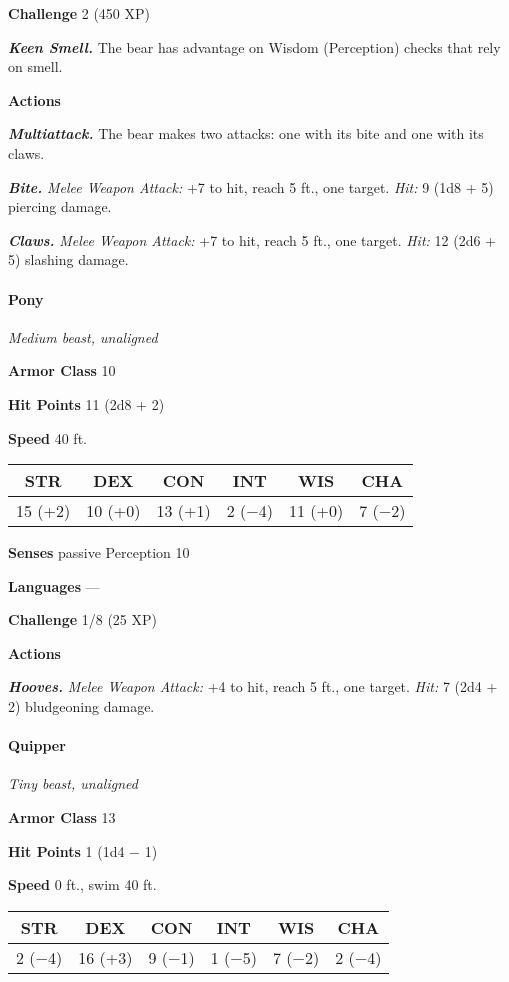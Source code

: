 \documentclass[
]{article}
\begin{document}
\textbf{Challenge} 2 (450 XP)

\emph{\textbf{Keen Smell.}} The bear has advantage on Wisdom
(Perception) checks that rely on smell.

\textbf{Actions}

\emph{\textbf{Multiattack.}} The bear makes two attacks: one with its
bite and one with its claws.

\emph{\textbf{Bite.}} \emph{Melee Weapon Attack:} +7 to hit, reach 5
ft., one target. \emph{Hit:} 9 (1d8 + 5) piercing damage.

\emph{\textbf{Claws.}} \emph{Melee Weapon Attack:} +7 to hit, reach 5
ft., one target. \emph{Hit:} 12 (2d6 + 5) slashing damage.

\hypertarget{pony}{%
\paragraph{Pony}\label{pony}}

\emph{Medium beast, unaligned}

\textbf{Armor Class} 10

\textbf{Hit Points} 11 (2d8 + 2)

\textbf{Speed} 40 ft.

\begin{longtable}[]{@{}cccccc@{}}
\toprule
STR & DEX & CON & INT & WIS & CHA\tabularnewline
\midrule
\endhead
15 (+2) & 10 (+0) & 13 (+1) & 2 (−4) & 11 (+0) & 7 (−2)\tabularnewline
\bottomrule
\end{longtable}

\textbf{Senses} passive Perception 10

\textbf{Languages} ---

\textbf{Challenge} 1/8 (25 XP)

\textbf{Actions}

\emph{\textbf{Hooves.}} \emph{Melee Weapon Attack:} +4 to hit, reach 5
ft., one target. \emph{Hit:} 7 (2d4 + 2) bludgeoning damage.

\hypertarget{quipper}{%
\paragraph{Quipper}\label{quipper}}

\emph{Tiny beast, unaligned}

\textbf{Armor Class} 13

\textbf{Hit Points} 1 (1d4 − 1)

\textbf{Speed} 0 ft., swim 40 ft.

\begin{longtable}[]{@{}cccccc@{}}
\toprule
STR & DEX & CON & INT & WIS & CHA\tabularnewline
\midrule
\endhead
2 (−4) & 16 (+3) & 9 (−1) & 1 (−5) & 7 (−2) & 2 (−4)\tabularnewline
\bottomrule
\end{longtable}
\end{document}
